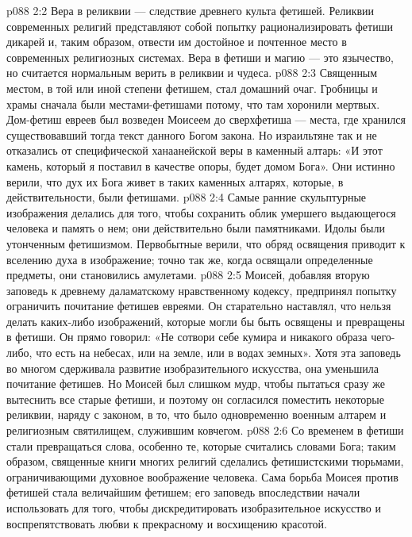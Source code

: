 \vs p088 2:2 Вера в реликвии --- следствие древнего культа фетишей. Реликвии современных религий представляют собой попытку рационализировать фетиши дикарей и, таким образом, отвести им достойное и почтенное место в современных религиозных системах. Вера в фетиши и магию --- это язычество, но считается нормальным верить в реликвии и чудеса.
\vs p088 2:3 Священным местом, в той или иной степени фетишем, стал домашний очаг. Гробницы и храмы сначала были местами\hyp{}фетишами потому, что там хоронили мертвых. Дом\hyp{}фетиш евреев был возведен Моисеем до сверхфетиша --- места, где хранился существовавший тогда текст данного Богом закона. Но израильтяне так и не отказались от специфической ханаанейской веры в каменный алтарь: «И этот камень, который я поставил в качестве опоры, будет домом Бога». Они истинно верили, что дух их Бога живет в таких каменных алтарях, которые, в действительности, были фетишами.
\vs p088 2:4 \pc Самые ранние скульптурные изображения делались для того, чтобы сохранить облик умершего выдающегося человека и память о нем; они действительно были памятниками. Идолы были утонченным фетишизмом. Первобытные верили, что обряд освящения приводит к вселению духа в изображение; точно так же, когда освящали определенные предметы, они становились амулетами.
\vs p088 2:5 Моисей, добавляя вторую заповедь к древнему даламатскому нравственному кодексу, предпринял попытку ограничить почитание фетишев евреями. Он старательно наставлял, что нельзя делать каких\hyp{}либо изображений, которые могли бы быть освящены и превращены в фетиши. Он прямо говорил: «Не сотвори себе кумира и никакого образа чего\hyp{}либо, что есть на небесах, или на земле, или в водах земных». Хотя эта заповедь во многом сдерживала развитие изобразительного искусства, она уменьшила почитание фетишев. Но Моисей был слишком мудр, чтобы пытаться сразу же вытеснить все старые фетиши, и поэтому он согласился поместить некоторые реликвии, наряду с законом, в то, что было одновременно военным алтарем и религиозным святилищем, служившим ковчегом.
\vs p088 2:6 \pc Со временем в фетиши стали превращаться слова, особенно те, которые считались словами Бога; таким образом, священные книги многих религий сделались фетишистскими тюрьмами, ограничивающими духовное воображение человека. Сама борьба Моисея против фетишей стала величайшим фетишем; его заповедь впоследствии начали использовать для того, чтобы дискредитировать изобразительное искусство и воспрепятствовать любви к прекрасному и восхищению красотой.
